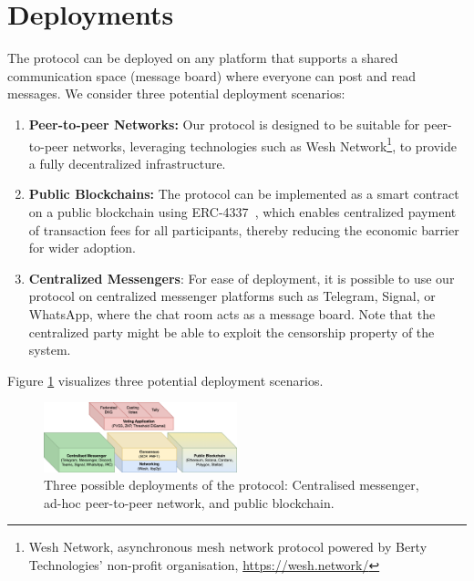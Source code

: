 \documentclass[lettersize,journal]{IEEEtran}
\theoremstyle{definition}
\begin{document}


\section{Deployments}
\label{sec:deployments}
The protocol can be deployed on any platform that supports a shared communication space (message board) where everyone can post and read messages. We consider three potential deployment scenarios:

\begin{enumerate}
    \item \textbf{Peer-to-peer Networks:} Our protocol is designed to be suitable for peer-to-peer networks, leveraging technologies such as Wesh Network\footnote{Wesh Network, asynchronous mesh network protocol powered by Berty Technologies' non-profit organisation, \url{https://wesh.network/}}, to provide a fully decentralized infrastructure.
    \item \textbf{Public Blockchains:}  The protocol can be implemented as a smart contract on a public blockchain using ERC-4337~\cite{ERC4337AccountAbstraction}, which enables centralized payment of transaction fees for all participants, thereby reducing the economic barrier for wider adoption.
    \item \textbf{Centralized Messengers}:  For ease of deployment, it is possible to use our protocol on centralized messenger platforms such as Telegram, Signal, or WhatsApp, where the chat room acts as a message board. Note that the centralized party might be able to exploit the censorship property of the system.
\end{enumerate}
Figure \ref{fig:stack-bc} visualizes three potential deployment scenarios.
\begin{figure}[h]
    \centering
    \includegraphics[width=0.5\textwidth]{stack-bc.png}
    \caption{Three possible deployments of the protocol: Centralised messenger, ad-hoc peer-to-peer network, and public blockchain.}
    \label{fig:stack-bc}
\end{figure}
\end{document}
